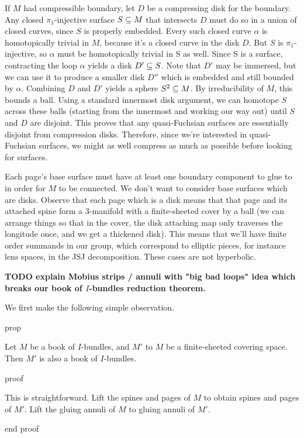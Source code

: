 If $M$ had compressible boundary, let $D$ be a compressing disk for the
boundary.  Any closed $\pi_1$-injective surface $S \subseteq M$ that intersects $D$
must do so in a union of closed curves, since $S$ is properly embedded. Every
such closed curve $\alpha$ is homotopically trivial in $M$, because it's
a closed curve in the disk $D$.  But $S$ is $\pi_1$-injective, so $\alpha$ must
be homotopically trivial in S as well. Since S is a surface, contracting the
loop $\alpha$ yields a disk $D'\subseteq S$. Note that $D'$ may be immersed, but we
can use it to produce a smaller disk $D''$ which is embedded and still bounded
by $\alpha$.  Combining $D$ and $D'$ yields a sphere $S^2 \subseteq M$. By
irreducibility of $M$, this bounds a ball.  Using a standard innermost disk
argument, we can homotope $S$ across these balls (starting from the innermost
and working our way out) until $S$ and $D$ are disjoint.  This proves that any
quasi-Fuchsian surfaces are essentially disjoint from compression disks.
Therefore, since we're interested in quasi-Fuchsian surfaces, we might as well
compress as much as possible before looking for surfaces.

Each page's base surface must have at least one boundary component to glue to
in order for $M$ to be connected. We don't want to consider base surfaces which
are disks.  Observe that each page which is a disk means that that page and its
attached spine form a 3-manifold with a finite-sheeted cover by a ball (we can
arrange things so that in the cover, the disk attaching map only traverses the
longitude once, and we get a thickened disk).  This means that we'll have
finite order summands in our group, which correspond to elliptic pieces, for
instance lens spaces, in the JSJ decomposition. These cases are not hyperbolic.

\textbf{TODO explain Mobius strips / annuli with "big bad loops" idea which
breaks our book of $I$-bundles reduction theorem.}

We first make the following simple observation.

prop

Let $M$ be a book of $I$-bundles, and $M'$ to $M$ be a finite-sheeted covering
space.  Then $M'$ is also a book of $I$-bundles.

proof

This is straightforward. Lift the spines and pages of $M$ to obtain spines and
pages of $M'$. Lift the gluing annuli of $M$ to gluing annuli of $M'$.

end proof


